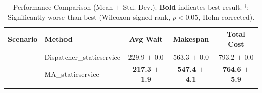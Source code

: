 \begin{table}[t]
\centering
\caption{Performance Comparison (Mean $\pm$ Std. Dev.). \textbf{Bold} indicates best result. $^\dagger$: Significantly worse than best (Wilcoxon signed-rank, $p<0.05$, Holm-corrected).}
\label{tab:performance}
\setlength{\tabcolsep}{6pt}
\begin{tabular}{llccc}
\toprule
\textbf{Scenario} & \textbf{Method} & \textbf{Avg Wait} & \textbf{Makespan} & \textbf{Total Cost} \\
\midrule
{}
 & Dispatcher_staticservice & 229.9 $\pm$ 0.0 & 563.3 $\pm$ 0.0 & 793.2 $\pm$ 0.0 \\
 & MA_staticservice & \textbf{217.3 $\pm$ 1.9} & \textbf{547.4 $\pm$ 4.1} & \textbf{764.6 $\pm$ 5.9} \\
\addlinespace
\bottomrule
\end{tabular}
\end{table}